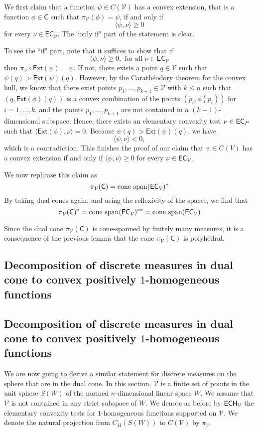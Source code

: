 \documentclass[12pt]{amsart}
\let\Subsection=\subsection
\renewcommand{\subsection}[2][empty]{%
  \ifthenelse{\equal{#1}{empty}}%
               {\xdef\SubsectionName{#2}%
                \Subsection{#2}}%
               {\xdef\SubsectionName{#1}%
                \Subsection[#1]{#2}}%
}
\begin{document}
\begin{Proof}
We first claim that a function $\psi \in C(\mathcal{V})$ has a convex extension, that is a function $\phi \in \mathsf{C}$ such that $\pi_{\mathcal{V}}(\phi) = \psi$, if and only if 
\[
\langle \psi , \nu \rangle \geq 0
\]
for every $\nu \in \mathsf{EC}_{\mathcal{V}}$. The ``only if" part of the statement is clear. 

To see the ``if" part, note that it suffices to show that if 
\[
\langle \psi, \nu \rangle \geq 0, \text{ for all } \nu \in \mathsf{EC}_{\mathcal{V}}
\]
then $\pi_{\mathcal{V}} \circ \mathsf{Ext}(\psi) = \psi$. If not, there exists a point $q \in \mathcal{V}$ such that $\psi(q) > \mathsf{Ext}(\psi)(q)$. However, by the Carath\'eodory theorem for the convex hull, we know that there exist points $p_1, \dots, p_{k+1} \in \mathcal{V}$ with $k \leq n$ such that $(q, \mathsf{Ext}(\phi)(q))$ is a convex combination of the points $(p_i, \phi(p_i))$ for $i=1, \dots, k$, and the points $p_1, \dots, p_{k+1}$ are not contained in a $(k-1)$-dimensional subspace. Hence, there exists an elementary convexity test $\nu \in \mathsf{EC}_P$ such that $\langle \mathsf{Ext}(\phi), \nu \rangle = 0$. 
Because $\psi(q) > \mathsf{Ext}(\psi)(q)$, we have
\[
\langle \psi , \nu \rangle < 0,
\]
which is a contradiction. 
This finishes the proof of our claim that $\psi \in C(V)$ has a convex extension if and only if $\langle \psi, \nu \rangle \geq 0$ for every $\nu \in \mathsf{EC}_{\mathcal{V}}$.

We now rephrase this claim as 
\[
	\pi_{\mathcal{V}}(\mathsf{C}) = \mathrm{cone\ span}(\mathsf{EC}_{\mathcal{V}})^* 
\]
By taking dual cones again, and using the reflexivity of the spaces, we find that
\[
	\pi_{\mathcal{V}}(\mathsf{C})^* = \mathrm{cone\ span}(\mathsf{EC}_{\mathcal{V}})^{**} = \mathrm{cone\ span}(\mathsf{EC}_{\mathcal{V}})
\]
\end{Proof}

Since the dual cone $\pi_{\mathcal{V}}(\mathsf{C})$ is cone-spanned by finitely many measures, it is a consequence of the previous lemma that the cone $\pi_{\mathcal{V}}(\mathsf{C})$ is polyhedral.

\subsection{Decomposition of discrete measures in dual cone to convex positively $1$-homogeneous functions}

We are now going to derive a similar statement for discrete measures on the sphere that are in the dual cone. 
In this section, $\mathcal{V}$ is a finite set of points in the unit sphere $S(W)$ of the normed $n$-dimensional linear space $W$.
We assume that $\mathcal{V}$ is not contained in any strict subspace of $W$. 
We denote as before by $\mathsf{ECH}_{\mathcal{V}}$ the elementary convexity tests for $1$-homogeneous functions supported on $\mathcal{V}$. We denote the natural projection from $C_H(S(W))$ to $C(\mathcal{V})$ by $\pi_{\mathcal{V}}$. 
\end{document}
